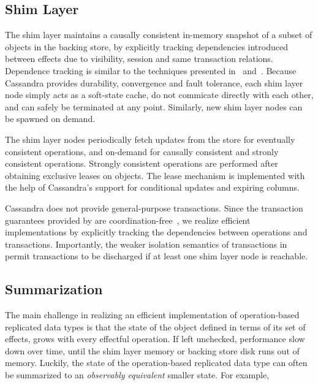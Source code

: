
\subsection{Shim Layer}

The shim layer maintains a causally consistent in-memory snapshot of a subset
of objects in the backing store, by explicitly tracking dependencies introduced
between effects due to visibility, session and same transaction relations.
Dependence tracking is similar to the techniques presented in~\cite{BoltOn}
and~\cite{Eiger}. Because Cassandra provides durability, convergence and fault
tolerance, each shim layer node simply acts as a soft-state cache, do not
commicate directly with each other, and can safely be terminated at any point.
Similarly, new shim layer nodes can be spawned on demand.

The shim layer nodes periodically fetch updates from the store for eventually
consistent operations, and on-demand for causally consistent and stronly
consistent operations. Strongly consistent operations are performed after
obtaining exclusive leases on objects. The lease mechanism is implemented with
the help of Cassandra's support for conditional updates and expiring columns.

Cassandra does not provide general-purpose transactions. Since the transaction
guarantees provided by \name are coordination-free~\cite{BailisHAT}, we realize
efficient implementations by explicitly tracking the dependencies between
operations and transactions. Importantly, the weaker isolation semantics of
transactions in \name permit transactions to be discharged if at least one shim
layer node is reachable.

\subsection{Summarization}

The main challenge in realizing an efficient implementation of
operation-based replicated data types is that the state of the object
defined in terms of its set of effects, grows with every effectful
operation. If left unchecked, performance slow down over time, until the
shim layer memory or backing store disk runs out of memory. Luckily, the
state of the operation-based replicated data type can often be summarized to
an \emph{observably equivalent} smaller state. For example,

